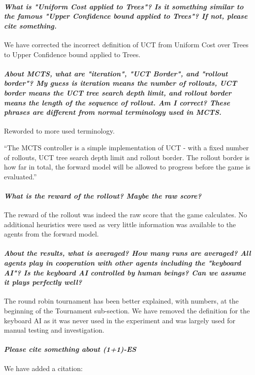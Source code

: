 \documentclass{article}
\begin{document}
\paragraph*{\textit{What is "Uniform Cost applied to Trees"? Is it something similar to the famous "Upper Confidence bound applied to Trees"? If not, please cite something.}}
We have corrected the incorrect definition of UCT from Uniform Cost over Trees to Upper Confidence bound applied to Trees.
\paragraph*{\textit{About MCTS, what are "iteration", "UCT Border", and "rollout border"? My guess is iteration means the number of rollouts,
UCT border means the UCT tree search depth limit, and rollout border means the length of the sequence of rollout. Am I correct? These phrases are different from normal terminology used in MCTS.}}
Reworded to more used terminology.

``The MCTS controller is a simple implementation of UCT - with a fixed number of rollouts, UCT tree search depth limit and rollout border. The rollout border is how far in total, the forward model will be allowed to progress before the game is evaluated.''
\paragraph*{\textit{What is the reward of the rollout? Maybe the raw score?}}
The reward of the rollout was indeed the raw score that the game calculates. No additional heuristics were used as very little information was available to the agents from the forward model.
\paragraph*{\textit{About the results, what is averaged? How many runs are averaged? All agents play in cooperation with other agents including the "keyboard AI"? Is the keyboard AI controlled by human beings? Can we assume it plays perfectly well?}}
The round robin tournament has been better explained, with numbers, at the beginning of the Tournament sub-section.
We have removed the definition for the keyboard AI as it was never used in the experiment and was largely used for manual testing and investigation.
\paragraph*{\textit{Please cite something about (1+1)-ES}}
We have added a citation:
\end{document}
